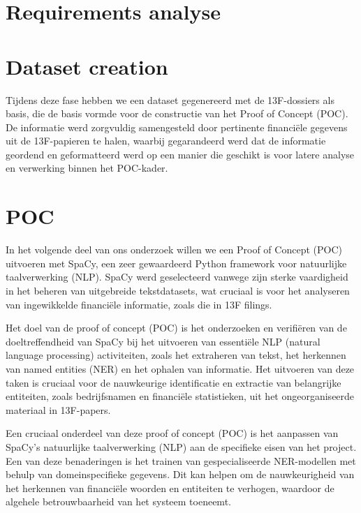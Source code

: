 \section{Requirements analyse}


\section{Dataset creation}
Tijdens deze fase hebben we een dataset gegenereerd met de 13F-dossiers als basis, die de basis vormde voor de constructie van het Proof of Concept (POC). De informatie werd zorgvuldig samengesteld door pertinente financiële gegevens uit de 13F-papieren te halen, waarbij gegarandeerd werd dat de informatie geordend en geformatteerd werd op een manier die geschikt is voor latere analyse en verwerking binnen het POC-kader.

\section{POC}


In het volgende deel van ons onderzoek willen we een Proof of Concept (POC) uitvoeren met SpaCy, een zeer gewaardeerd Python framework voor natuurlijke taalverwerking (NLP). SpaCy werd geselecteerd vanwege zijn sterke vaardigheid in het beheren van uitgebreide tekstdatasets, wat cruciaal is voor het analyseren van ingewikkelde financiële informatie, zoals die in 13F filings.

Het doel van de proof of concept (POC) is het onderzoeken en verifiëren van de doeltreffendheid van SpaCy bij het uitvoeren van essentiële NLP (natural language processing) activiteiten, zoals het extraheren van tekst, het herkennen van named entities (NER) en het ophalen van informatie. Het uitvoeren van deze taken is cruciaal voor de nauwkeurige identificatie en extractie van belangrijke entiteiten, zoals bedrijfsnamen en financiële statistieken, uit het ongeorganiseerde materiaal in 13F-papers.

Een cruciaal onderdeel van deze proof of concept (POC) is het aanpassen van SpaCy's natuurlijke taalverwerking (NLP) aan de specifieke eisen van het project. Een van deze benaderingen is het trainen van gespecialiseerde NER-modellen met behulp van domeinspecifieke gegevens. Dit kan helpen om de nauwkeurigheid van het herkennen van financiële woorden en entiteiten te verhogen, waardoor de algehele betrouwbaarheid van het systeem toeneemt.

